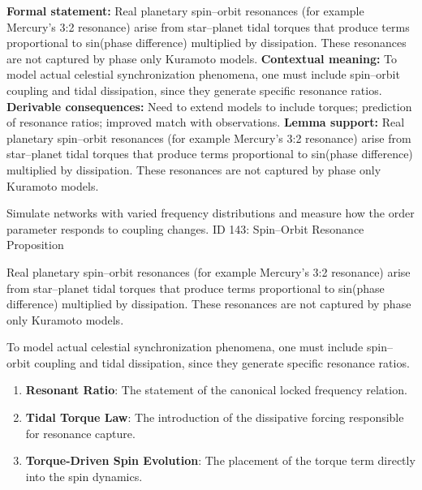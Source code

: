 \begingroup\footnotesize\setlength{\emergencystretch}{3em}\sloppy
\textbf{Formal statement:} Real planetary spin--orbit resonances (for example Mercury's 3:2 resonance) arise from star--planet tidal torques that produce terms proportional to sin(phase difference) multiplied by dissipation. These resonances are not captured by phase only Kuramoto models.
\textbf{Contextual meaning:} To model actual celestial synchronization phenomena, one must include spin--orbit coupling and tidal dissipation, since they generate specific resonance ratios.
\textbf{Derivable consequences:} Need to extend models to include torques; prediction of resonance ratios; improved match with observations.
\textbf{Lemma support:} Real planetary spin--orbit resonances (for example Mercury's 3:2 resonance) arise from star--planet tidal torques that produce terms proportional to sin(phase difference) multiplied by dissipation. These resonances are not captured by phase only Kuramoto models.\par
\endgroup

Simulate networks with varied frequency distributions and measure how the order parameter responds to coupling changes. ID 143: Spin--Orbit Resonance Proposition

Real planetary spin--orbit resonances (for example Mercury's 3:2 resonance) arise from star--planet tidal torques that produce terms proportional to sin(phase difference) multiplied by dissipation. These resonances are not captured by phase only Kuramoto models.

To model actual celestial synchronization phenomena, one must include spin--orbit coupling and tidal dissipation, since they generate specific resonance ratios.
\endgroup

\begin{enumerate}[leftmargin=1.6em,itemsep=6pt,topsep=4pt]
\item \textbf{Resonant Ratio}: The statement of the canonical locked frequency relation.
\item \textbf{Tidal Torque Law}: The introduction of the dissipative forcing responsible for resonance capture.
\item \textbf{Torque-Driven Spin Evolution}: The placement of the torque term directly into the spin dynamics.
\end{enumerate}

